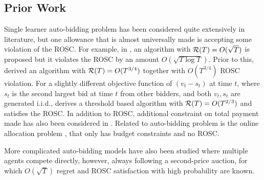 \vspace{-0.1in}
\subsection{Prior Work}
Single learner auto-bidding problem has been considered quite extensively in literature, but one allowance that is almost universally made is accepting some violation of the ROSC. For example, in \cite{Feng}, an algorithm with $\mathcal{R}(T) = O(\sqrt{T})$ is proposed but it violates the ROSC by an amount  $O(\sqrt{T\log T})$. Prior to this, \cite{castiglioni2022unifying} derived an algorithm with $\mathcal{R}(T) =O(T^{3/4})$ together with $O(T^{3/4})$ ROSC violation. For a slightly different objective function of $(v_t-s_t)$ at time $t$, where $s_t$ is the second largest bid at time $t$ from other bidders, and both $v_t,s_t$ are generated i.i.d., \cite{golrezaei2021bidding} derives a threshold based algorithm with $\mathcal{R}(T) = O(T^{2/3})$ and satisfies the ROSC. In addition to ROSC, additional constraint on total payment made 
has also been considered in \cite{Feng, castiglioni2022unifying, golrezaei2021bidding}. 
Related to auto-bidding problem is the online allocation problem \cite{balseiro2020dual}, that only has budget constraints and no ROSC.


More complicated auto-bidding models \cite{borgs2007dynamics, golrezaei2021auction, chen2023complexity, lucier2024autobidders} 
have also been studied where multiple agents compete directly, however, always following a second-price auction, for which $O(\sqrt{T})$ regret and ROSC satisfaction with high probability are known. 


\vspace{-0.1in}
